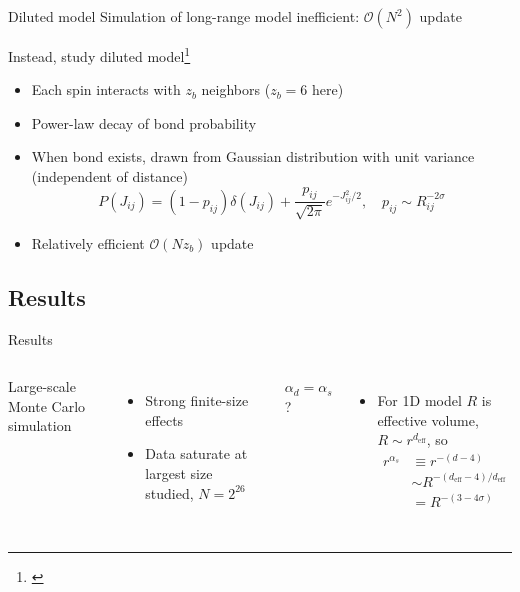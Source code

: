 \documentclass{beamer}
\begin{document}
\begin{frame}{Diluted model}
  Simulation of long-range model inefficient: $\mathcal{O}(N^2)$ update

  Instead, study \alert{diluted model\footnote{\textcite{leuzzi2008dilute}}}
  \begin{itemize}
    \item Each spin interacts with $z_b$ neighbors ($z_b=6$ here)
    \item Power-law decay of bond \alert{probability}
    \item When bond exists, drawn from Gaussian distribution with unit variance
      (independent of distance)
      \begin{equation*}
        P(J_{ij}) = (1-p_{ij})\delta(J_{ij}) +
        \frac{p_{ij}}{\sqrt{2\pi}} e^{-J_{ij}^2/2},\quad
        p_{ij} \sim R_{ij}^{-2\sigma}
      \end{equation*}
    \item Relatively efficient $\mathcal{O}(N z_b)$ update
  \end{itemize}
\end{frame}


\subsection{Results}

\begin{frame}{Results}
  \begin{columns}
    Large-scale Monte Carlo simulation
    \begin{itemize}
      \item Strong finite-size effects
      \item Data saturate at largest size studied, $N=2^{26}$
    \end{itemize}
    \alert{$\alpha_d=\alpha_s$?}
    \begin{itemize}
      \item For 1D model $R$ is effective volume,
        $R \sim r^{d_{\text{eff}}}$, so\footnotemark
        \begin{align*}
          r^{\alpha_s}
          &\equiv r^{-(d-4)} \\
          &\sim R^{-(d_{\text{eff}}-4)/d_{\text{eff}}} \\
          &= R^{-(3-4\sigma)}
        \end{align*}
    \end{itemize}
    
  \end{columns}
\end{frame}
\end{document}
